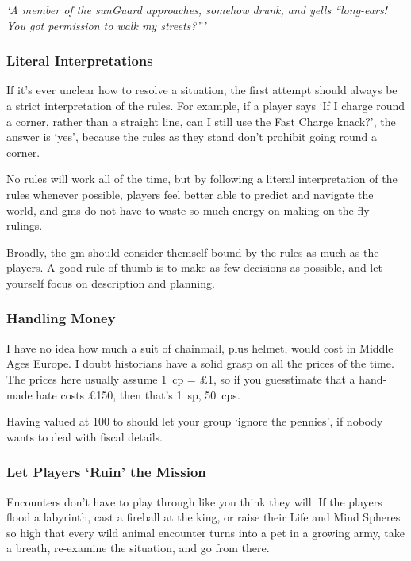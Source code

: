 \begin{multicols}{2}
\textit{`A member of the \gls{sunGuard} approaches, somehow drunk, and yells ``long-ears! You got permission to walk my streets?'''}

\subsubsection{Literal Interpretations}

If it's ever unclear how to resolve a situation, the first attempt should always be a strict interpretation of the rules.
For example, if a player says `If I charge round a corner, rather than a straight line, can I still use the Fast Charge knack?', the answer is `yes', because the rules as they stand don't prohibit going round a corner.

No rules will work all of the time, but by following a literal interpretation of the rules whenever possible, players feel better able to predict and navigate the world, and \glspl{gm} do not have to waste so much energy on making on-the-fly rulings.

Broadly, the \gls{gm} should consider themself bound by the rules as much as the players.
A good rule of thumb is to make as few decisions as possible, and let yourself focus on description and planning.

\subsubsection{Handling Money}
I have no idea how much a suit of chainmail, plus helmet, would cost in Middle Ages Europe.
I doubt historians have a solid grasp on all the prices of the time.
The prices here usually assume 1~\gls{cp} = \pounds1, so if you guesstimate that a hand-made hate costs \pounds150, then that's 1~\gls{sp}, 50~\glspl{cp}.

Having  valued at 100 to  should let your group `ignore the pennies', if nobody wants to deal with fiscal details.

\subsubsection{Let Players `Ruin' the Mission}

Encounters don't have to play through like you think they will.
If the players flood a labyrinth, cast a fireball at the king, or raise their Life and Mind Spheres so high that every wild animal encounter turns into a pet in a growing army, take a breath, re-examine the situation, and go from there.


\end{multicols}
